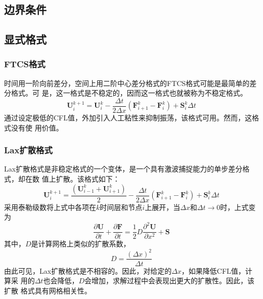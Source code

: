 \subsection{边界条件}

\subsection{显式格式}

\subsubsection{FTCS格式}
时间用一阶向前差分，空间上用二阶中心差分格式的FTCS格式可能是最简单的差分格式。可
是，这一格式是不稳定的，因而这一格式也就被称为不稳定格式。
\begin{equation}
  \mathbf{U}_{i}^{k+1} 
  =
  \mathbf{U}_{i}^{k} -
  \frac{\Delta t}{2\Delta x}(\mathbf{F}_{i+1}^{k}-\mathbf{F}_{i}^{k}) + 
  \mathbf{S}_{i}^{k}\Delta t
\end{equation}
通过设定极低的CFL值，外加引入人工粘性来抑制振荡，该格式可用。然而，这格式没有使
用价值。

\subsubsection{Lax扩散格式}
Lax扩散格式是非稳定格式的一个变体，是一个具有激波捕捉能力的单步差分格式，却在数
值上扩散。该格式如下：
\begin{equation}
  \mathbf{U}_{i}^{k+1} 
  =
  \frac{(\mathbf{U}_{i-1}^{k} + \mathbf{U}_{i+1}^{k})}{2} -
  \frac{\Delta t}{2\Delta x}(\mathbf{F}_{i+1}^{k}-\mathbf{F}_{i}^{k}) + 
  \mathbf{S}_{i}^{k}\Delta t
\end{equation}
采用泰勒级数将上式中各项在$k$时间层和节点$i$上展开，当$\Delta x$和$\Delta
t\rightarrow 0$时，上式变为
\begin{equation}
  \frac{\partial \mathbf{U}}{\partial t} +
  \frac{\partial \mathbf{F}}{\partial t} =
  \frac{1}{2}D\frac{{\partial}^{2} \mathbf{U}}{\partial {x}^{2}} +
  \mathbf{S}
\end{equation}
其中，$D$是计算网格上类似的扩散系数，
\begin{equation}
D =
\frac{(\Delta x)^{2}}{\Delta t}
\end{equation}
由此可见，Lax扩散格式是不相容的。因此，对给定的$\Delta x$，如果降低CFL值，计算采
用的$\Delta t$也会降低，$D$会增加，求解过程中会表现出更大的扩散性。因此，该扩散
格式具有网格相关性。



